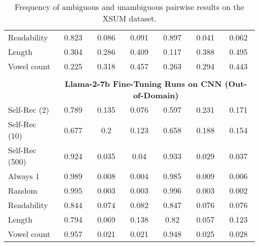 \begin{table}[h]
\begin{tabular}{l|cccccc}
        Readability                        & 0.823       & 0.086     & 0.091        & 0.897       & 0.041     & 0.062       \\
        Length                             & 0.304       & 0.286     & 0.409        & 0.117       & 0.388     & 0.495       \\
        Vowel count                        & 0.225       & 0.318     & 0.457        & 0.263       & 0.294     & 0.443       \\
        \multicolumn{7}{c}{} \\
        \multicolumn{1}{c}{} & \multicolumn{6}{c}{\textbf{Llama-2-7b Fine-Tuning Runs on CNN (Out-of-Domain)}} \\
        Self-Rec (2)                       & 0.789       & 0.135     & 0.076        & 0.597       & 0.231     & 0.171       \\
        Self-Rec (10)                      & 0.677       & 0.2       & 0.123        & 0.658       & 0.188     & 0.154       \\
        Self-Rec (500)                     & 0.924       & 0.035     & 0.04         & 0.933       & 0.029     & 0.037       \\
        Always 1                           & 0.989       & 0.008     & 0.004        & 0.985       & 0.009     & 0.006       \\
        Random                             & 0.995       & 0.003     & 0.003        & 0.996       & 0.003     & 0.002       \\
        Readability                        & 0.844       & 0.074     & 0.082        & 0.847       & 0.076     & 0.076       \\
        Length                             & 0.794       & 0.069     & 0.138        & 0.82        & 0.057     & 0.123       \\
        Vowel count                        & 0.957       & 0.021     & 0.021        & 0.948       & 0.025     & 0.028       \\
    \end{tabular}
    \caption{Frequency of ambiguous and unambiguous pairwise results on the XSUM dataset.}
    \label{table:ambiguous_xsum}
\end{table}

